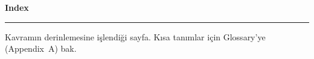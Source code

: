 \clearpage
{}
\noindent{}\par
\vspace{2pt}
{\sffamily\bfseries\fontsize{25}{28}\selectfont Index\par}
\vspace{2pt}\textcolor{accent}{\rule{34mm}{2pt}}\par
\vspace{2pt}
{\color{softgray}\small Kavramın derinlemesine işlendiği sayfa. Kısa tanımlar için Glossary'ye (Appendix~A) bak.}
\vspace{4pt}

\newcommand{\ixl}[1]{\par\vspace{4pt}{\sffamily\bfseries\footnotesize\color{accent}#1}\par\vspace{1pt}}
\newcommand{\ix}[2]{\noindent#1\,\dotfill\,{\sffamily\footnotesize #2}\par\vspace{0.5pt}}
\newcommand{\ixsee}[2]{\noindent#1 \,{\itshape\footnotesize\color{softgray}→ bkz. #2}\par\vspace{0.5pt}}

